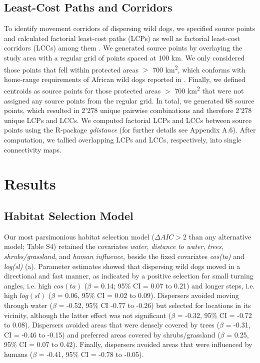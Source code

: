 \documentclass[abstract=on,10pt,a4paper,bibliography=totocnumbered]{article}
\begin{document}
\subsection{Least-Cost Paths and Corridors}
To identify movement corridors of dispersing wild dogs, we specified source
points and calculated factorial least-cost paths (LCPs) as well as factorial
least-cost corridors (LCCs) among them \citep{Elliot.2014}. We generated source
points by overlaying the study area with a regular grid of points spaced at 100
km. We only considered those points that fell within protected areas \(>\) 700
km\textsuperscript{2}, which conforms with home-range requirements of African
wild dogs reported in \cite{Pomilia.2015}. Finally, we defined centroids as
source points for those protected areas \(>\) 700 km\textsuperscript{2} that
were not assigned any source points from the regular grid. In total, we
generated 68 source points, which resulted in 2'278 unique pairwise combinations
and therefore 2'278 unique LCPs and LCCs. We computed factorial LCPs and LCCs
between source points using the R-package \textit{gdistance} (for further
details see Appendix A.6). After computation, we tallied overlapping LCPs and
LCCs, respectively, into single connectivity maps.

\section{Results}
\subsection{Habitat Selection Model}
Our most parsimonious habitat selection model (\(\Delta AIC > 2\) than any
alternative model; Table S4) retained the covariates \textit{water},
\textit{distance to water}, \textit{trees}, \textit{shrubs/grassland}, and
\textit{human influence}, beside the fixed covariates \textit{cos(ta)} and
\textit{log(sl)} (a). Parameter estimates showed that
dispersing wild dogs moved in a directional and fast manner, as indicated by a
positive selection for small turning angles, i.e. high \(cos(ta)\) (\(\beta\) =
0.14; 95\% CI = 0.07 to 0.21) and longer steps, i.e. high \(log(sl)\) (\(\beta\)
= 0.06, 95\% CI = 0.02 to 0.09). Dispersers avoided moving through water
(\(\beta\) = -0.52, 95\% CI -0.77 to -0.26) but selected for locations in its
vicinity, although the latter effect was not significant (\(\beta\) = -0.32,
95\% CI = -0.72 to 0.08). Dispersers avoided areas that were densely covered by
trees (\(\beta\) = -0.31, CI = -0.46 to -0.15) and preferred areas covered by
shrubs/grassland (\(\beta\) = 0.25, 95\% CI = 0.07 to 0.42). Finally, dispersers
avoided areas that were influenced by humans (\(\beta\) = -0.41, 95\% CI = -0.78
to -0.05).
\end{document}
